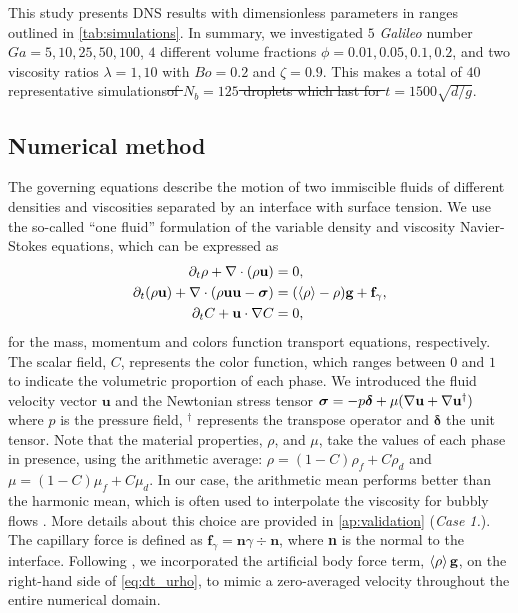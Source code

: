 \documentclass[11pt]{My_preprint}
\providecommand{\DIFadd}[1]{{\protect\color{blue}\uwave{#1}}} %
\providecommand{\DIFdel}[1]{{\protect\color{red}\sout{#1}}}                      %
\providecommand{\DIFaddbegin}{} %
\providecommand{\DIFaddend}{} %
\providecommand{\DIFdelbegin}{} %
\providecommand{\DIFdelend}{} %
\begin{document}
This study presents DNS results with dimensionless parameters in ranges outlined in \ref{tab:simulations}.
In summary, we investigated $5$ \textit{Galileo} number \DIFdelbegin \DIFdel{$Ga = 5,10,25,50,100$}\DIFdelend \DIFaddbegin \DIFadd{$Ga = 5,10,25,50,80$}\DIFaddend , $4$ different volume fractions $\phi = 0.01,0.05,0.1,0.2$, and two viscosity ratios $\lambda =1,10$ with \DIFdelbegin \DIFdel{$Bo = 0.2$ }\DIFdelend \DIFaddbegin \DIFadd{$Bo = 0.5$ }\DIFaddend and $\zeta = 0.9$. This makes a total of $40$ representative simulations\DIFdelbegin \DIFdel{of $N_b = 125$ droplets which last for $t= 1500 \sqrt{d/g}$}\DIFdelend . \subsection{Numerical method}
The governing equations describe the motion of two immiscible fluids of different densities and viscosities separated by an interface with surface tension. 
We use the so-called ``one fluid'' formulation of the variable density and viscosity Navier-Stokes equations, which can be expressed as \citep{tryggvason2011direct}
\begin{align}
    \partial_t \rho+ \mathbf{\nabla}\cdot(\rho\textbf{u})
    &= 0,\\
    \label{eq:dt_urho}
    \partial_t (\rho \textbf{u})
    + \mathbf{\nabla}\cdot (\rho  \textbf{u} \textbf{u} - \bm\sigma)
    &= (\left<\rho\right> - \rho)\textbf{g}
    + \textbf{f}_\gamma,\\
    \label{eq:dt_C}
    \partial_t C + \textbf{u}\cdot\mathbf{\nabla} C  
    &= 0,
\end{align}
for the mass, momentum and colors function transport equations, respectively. 
The scalar field, $C$, represents the color function, which ranges between $0$ and $1$ to indicate the volumetric proportion of each phase.
We introduced the fluid velocity vector $\textbf{u}$ and the Newtonian stress tensor $\bm{\sigma} = -p \bm\delta + \mu (\mathbf{\nabla} \textbf{u}+ \mathbf{\nabla} \textbf{u}^\dagger)$ where $p$ is the pressure field, $^\dagger$ represents the transpose operator and $\bm\delta$ the unit tensor.
Note that the material properties, $\rho$, and $\mu$, take the values of each phase in presence, using the arithmetic average: $\rho = (1-C)\rho_f + C \rho_d$ and $\mu = (1-C)\mu_f + C \mu_d$. 
In our case, the arithmetic mean performs better than the harmonic mean, which is often used to interpolate the viscosity for bubbly flows \citet{hidman2023assessing,innocenti2020direct}.
More details about this choice are provided in \ref{ap:validation} (\textit{Case 1.}). 
The capillary force is defined as $\textbf{f}_\gamma =\textbf{n} \gamma \div \textbf{n} $, where \textbf{n} is the normal to the interface.
Following  \citep{bunner2002dynamics}, we incorporated the artificial body force term, $\left<\rho\right>\textbf{g}$, on the right-hand side of \ref{eq:dt_urho}, to mimic a zero-averaged velocity throughout the entire numerical domain.  
\end{document}
